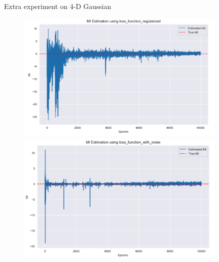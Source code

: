 \documentclass[final]{beamer}
\newlength{\sepwidth}
\newlength{\colwidth}
\newcommand{\separatorcolumn}{\begin{column}{\sepwidth}\end{column}}
\begin{document}
\begin{frame}[t]
\begin{columns}[t]
\begin{column}{\colwidth}
\begin{block}{Extra experiment on 4-D Gaussian}
    \begin{figure}
    \centering
    \begin{minipage}{0.49\textwidth}
    \centering
    \includegraphics[width=1.02\linewidth]{4d/截屏2024-12-31 13.59.22.png}
    \end{minipage}
    \begin{minipage}{0.49\textwidth}
    \centering
    \centering
    \includegraphics[width=1\linewidth]{4d/截屏2024-12-31 13.59.35.png}
    \end{minipage}
    \end{figure}
    
    \end{block}


\end{column}
\separatorcolumn

\begin{column}{\colwidth}



\end{column}
\end{columns}
\end{frame}
\end{document}
